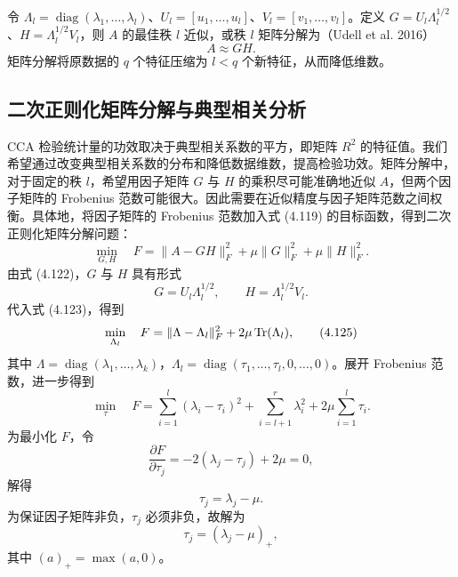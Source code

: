 令 $\Lambda_l=\operatorname{diag}(\lambda_1,\ldots,\lambda_l)$、$U_l=[u_1,\ldots,u_l]$、$V_l=[v_1,\ldots,v_l]$。定义 $G=U_l\Lambda_l^{1/2}$、$H=\Lambda_l^{1/2}V_l$，则 $A$ 的最佳秩 $l$ 近似，或秩 $l$ 矩阵分解为（Udell et al. 2016）
\begin{equation}
A\approx GH.
\tag{4.122}
\end{equation}
矩阵分解将原数据的 $q$ 个特征压缩为 $l<q$ 个新特征，从而降低维数。

\subsection{二次正则化矩阵分解与典型相关分析}
CCA 检验统计量的功效取决于典型相关系数的平方，即矩阵 $R^2$ 的特征值。我们希望通过改变典型相关系数的分布和降低数据维数，提高检验功效。矩阵分解中，对于固定的秩 $l$，希望用因子矩阵 $G$ 与 $H$ 的乘积尽可能准确地近似 $A$，但两个因子矩阵的 Frobenius 范数可能很大。因此需要在近似精度与因子矩阵范数之间权衡。具体地，将因子矩阵的 Frobenius 范数加入式 (4.119) 的目标函数，得到二次正则化矩阵分解问题：
\begin{equation}
\min_{G,H}\quad F=\lVert A-GH\rVert_F^2+\mu\lVert G\rVert_F^2+\mu\lVert H\rVert_F^2.
\tag{4.123}
\end{equation}
由式 (4.122)，$G$ 与 $H$ 具有形式
\begin{equation}
G=U_l\Lambda_l^{1/2},\qquad H=\Lambda_l^{1/2}V_l.
\tag{4.124}
\end{equation}
代入式 (4.123)，得到
\begin{equation}
\min_{\Lambda_l}\quad F=\lVert\Lambda-\Lambda_l\rVert_F^2+2\mu\operatorname{Tr}(\Lambda_l),
\tag{4.125}
\end{equation}
其中 $\Lambda=\operatorname{diag}(\lambda_1,\ldots,\lambda_k)$，$\Lambda_l=\operatorname{diag}(\tau_1,\ldots,\tau_l,0,\ldots,0)$。展开 Frobenius 范数，进一步得到
\begin{equation}
\min_{\tau}\quad F=\sum_{i=1}^{l}(\lambda_i-\tau_i)^2
+\sum_{i=l+1}^{r}\lambda_i^2+2\mu\sum_{i=1}^{l}\tau_i.
\tag{4.126}
\end{equation}
为最小化 $F$，令
\begin{equation}
\frac{\partial F}{\partial\tau_j}=-2(\lambda_j-\tau_j)+2\mu=0,
\tag{4.127}
\end{equation}
解得
\begin{equation}
\tau_j=\lambda_j-\mu.
\tag{4.128}
\end{equation}
为保证因子矩阵非负，$\tau_j$ 必须非负，故解为
\begin{equation}
\tau_j=(\lambda_j-\mu)_+,
\tag{4.129}
\end{equation}
其中 $(a)_+=\max(a,0)$。

